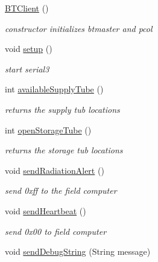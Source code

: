 \begin{DoxyCompactItemize}
\item 
\hypertarget{classBTClient_a60dc22e0906a1cea7a88813bb6d98f96}{\hyperlink{classBTClient_a60dc22e0906a1cea7a88813bb6d98f96}{B\-T\-Client} ()}\label{classBTClient_a60dc22e0906a1cea7a88813bb6d98f96}

\begin{DoxyCompactList}\small\item\em constructor initializes btmaster and pcol \end{DoxyCompactList}\item 
\hypertarget{classBTClient_aefdc156fe1f22455d249ec0bb7fa3fd5}{void \hyperlink{classBTClient_aefdc156fe1f22455d249ec0bb7fa3fd5}{setup} ()}\label{classBTClient_aefdc156fe1f22455d249ec0bb7fa3fd5}

\begin{DoxyCompactList}\small\item\em start serial3 \end{DoxyCompactList}\item 
int \hyperlink{classBTClient_a67250c48f81fee2b7c9f26d100c26799}{available\-Supply\-Tube} ()
\begin{DoxyCompactList}\small\item\em returns the supply tub locations \end{DoxyCompactList}\item 
int \hyperlink{classBTClient_a18e2223a0605a0ee67b5d004890b38c4}{open\-Storage\-Tube} ()
\begin{DoxyCompactList}\small\item\em returns the storage tub locations \end{DoxyCompactList}\item 
\hypertarget{classBTClient_a70cc30b8de8632bd6fb81972a9409a10}{void \hyperlink{classBTClient_a70cc30b8de8632bd6fb81972a9409a10}{send\-Radiation\-Alert} ()}\label{classBTClient_a70cc30b8de8632bd6fb81972a9409a10}

\begin{DoxyCompactList}\small\item\em send 0xff to the field computer \end{DoxyCompactList}\item 
\hypertarget{classBTClient_a4bf8f58f2c83834cab585e69c55c171f}{void \hyperlink{classBTClient_a4bf8f58f2c83834cab585e69c55c171f}{send\-Heartbeat} ()}\label{classBTClient_a4bf8f58f2c83834cab585e69c55c171f}

\begin{DoxyCompactList}\small\item\em send 0x00 to field computer \end{DoxyCompactList}\item 
\hypertarget{classBTClient_a57a82b64a1233a66450c1d9ebe48774c}{void \hyperlink{classBTClient_a57a82b64a1233a66450c1d9ebe48774c}{send\-Debug\-String} (String message)}\label{classBTClient_a57a82b64a1233a66450c1d9ebe48774c}


\end{DoxyCompactItemize}
